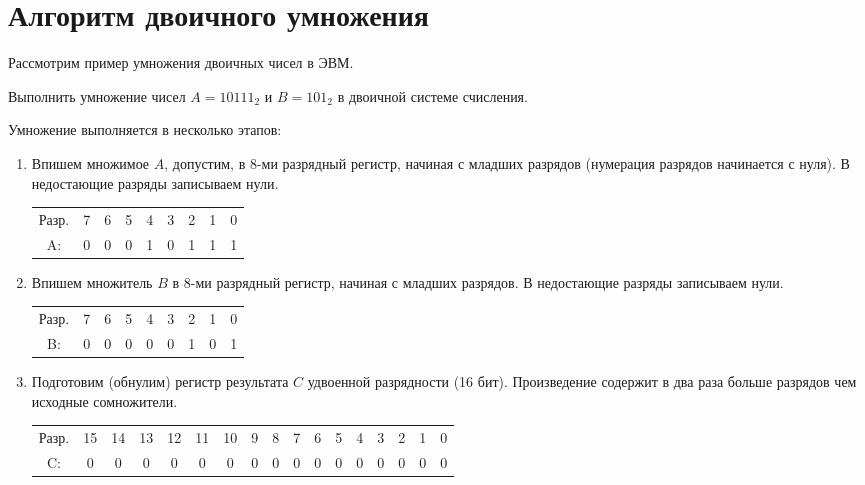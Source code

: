 \documentclass[12pt,a4paper]{scrartcl}
\begin{document}
	
\section{Алгоритм двоичного умножения}

Рассмотрим пример умножения двоичных чисел в ЭВМ.

Выполнить умножение чисел $A = 10111_2$ и $B = 101_2$ в двоичной системе счисления.

Умножение выполняется в несколько этапов:

\begin{enumerate}
	
	\item Впишем множимое $A$, допустим, в 8-ми разрядный регистр, начиная с младших разрядов (нумерация разрядов начинается с нуля). В недостающие разряды записываем нули.
	
	\begin{table}[H]
		\centering
		\begin{tabular}{ccccccccc}
			Разр. & 7 & 6 & 5 & 4 & 3 & 2 & 1 & 0 \\
			A:    & 0 & 0 & 0 & 1 & 0 & 1 & 1 & 1
		\end{tabular}
	\end{table}
	
	\item Впишем множитель $B$ в 8-ми разрядный регистр, начиная с младших разрядов. В недостающие разряды записываем нули.
	
	\begin{table}[H]
		\centering
		\begin{tabular}{ccccccccc}
			Разр. & 7 & 6 & 5 & 4 & 3 & 2 & 1 & 0 \\
			B:    & 0 & 0 & 0 & 0 & 0 & 1 & 0 & 1
		\end{tabular}
	\end{table}
	
	\item Подготовим (обнулим) регистр результата $C$ удвоенной разрядности (16 бит). Произведение содержит в два раза больше разрядов чем исходные сомножители.
	
	\begin{table}[H]
		\centering
		\begin{tabular}{ccccccccccccccccc}
			Разр. & 15 & 14 & 13 & 12 & 11 & 10 & 9 & 8 & 7 & 6 & 5 & 4 & 3 & 2 & 1 & 0 \\
			C:    & 0  & 0  & 0  & 0  & 0  & 0  & 0 & 0 & 0 & 0 & 0 & 0 & 0 & 0 & 0 & 0
		\end{tabular}
	\end{table}
	

\end{enumerate}
\end{document}
